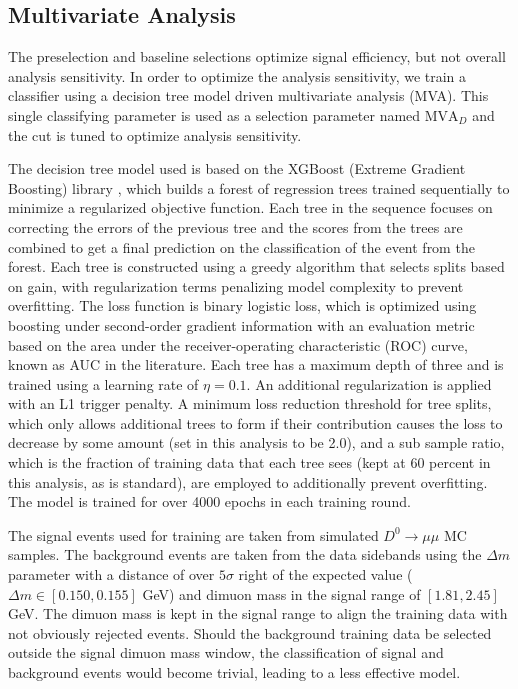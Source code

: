 

\subsection{Multivariate Analysis}
\label{subsec:mva}

The preselection and baseline selections optimize signal efficiency, but not overall analysis sensitivity. In order to optimize the analysis sensitivity, we train a classifier using a decision tree model driven multivariate analysis (MVA). This single classifying parameter is used as a selection parameter named $\text{MVA}_D$ and the cut is tuned to optimize analysis sensitivity.

The decision tree model used is based on the XGBoost (Extreme Gradient Boosting) library \cite{ref:chen_Guestrin_2016}, which builds a forest of regression trees trained sequentially to minimize a regularized objective function. Each tree in the sequence focuses on correcting the errors of the previous tree and the scores from the trees are combined to get a final prediction on the classification of the event from the forest. Each tree is constructed using a greedy algorithm that selects splits based on gain, with regularization terms penalizing model complexity to prevent overfitting. The loss function is binary logistic loss, which is optimized using boosting under second-order gradient information with an evaluation metric based on the area under the receiver-operating characteristic (ROC) curve, known as AUC in the literature. Each tree has a maximum depth of three and is trained using a learning rate of $\eta = 0.1$. An additional regularization is applied with an L1 trigger penalty. A minimum loss reduction threshold for tree splits, which only allows additional trees to form if their contribution causes the loss to decrease by some amount (set in this analysis to be 2.0), and a sub sample ratio, which is the fraction of training data that each tree sees (kept at 60 percent in this analysis, as is standard), are employed to additionally prevent overfitting. The model is trained for over 4000 epochs in each training round.

The signal events used for training are taken from simulated $D^0 \to \mu \mu$ MC samples. The background events are taken from the data sidebands using the $\Delta m$ parameter with a distance of over $5\sigma$ right of the expected value ($\Delta m \in [0.150, 0.155]$ GeV) and dimuon mass in the signal range of $[1.81, 2.45]$ GeV. The dimuon mass is kept in the signal range to align the training data with not obviously rejected events. Should the background training data be selected outside the signal dimuon mass window, the classification of signal and background events would become trivial, leading to a less effective model.

